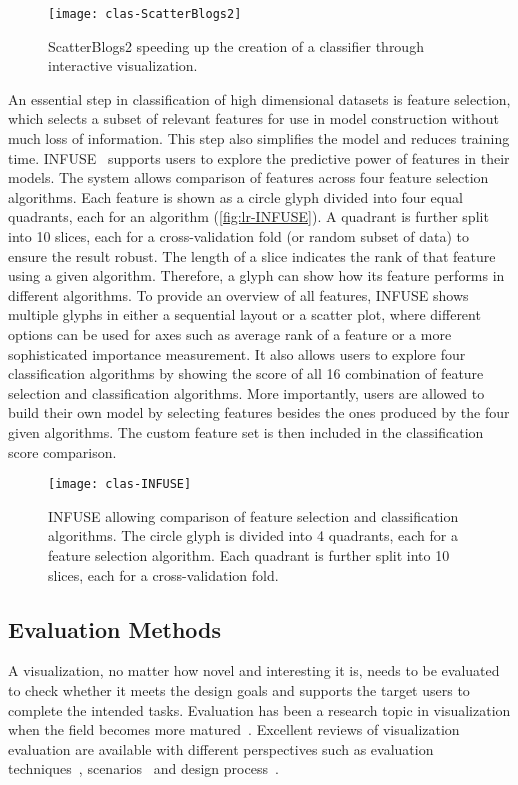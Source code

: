 \begin{figure}[!htb]
	\centering
	\texttt{[image: clas-ScatterBlogs2]}
	\caption[ScatterBlogs2 -- interactive classifier]{ScatterBlogs2 speeding up the creation of a classifier through interactive visualization. }
	\label{fig:lr-ScatterBlogs2}
\end{figure}

An essential step in classification of high dimensional datasets is feature selection, which selects a subset of relevant features for use in model construction without much loss of information. This step also simplifies the model and reduces training time. INFUSE~\cite{Krause2014} supports users to explore the predictive power of features in their models. The system allows comparison of features across four feature selection algorithms. Each feature is shown as a circle glyph divided into four equal quadrants, each for an algorithm (\autoref{fig:lr-INFUSE}). A quadrant is further split into 10 slices, each for a cross-validation fold (or random subset of data) to ensure the result  robust. The length of a slice indicates the rank of that feature using a given algorithm. Therefore, a glyph can show how its feature performs in different algorithms. To provide an overview of all features, INFUSE shows multiple glyphs in either a sequential layout or a scatter plot, where different options can be used for axes such as average rank of a feature or a more sophisticated importance measurement. It also allows users to explore four classification algorithms by showing the score of all 16 combination of feature selection and classification algorithms. More importantly, users are allowed to build their own model by selecting features besides the ones produced by the four given algorithms. The custom feature set is then included in the classification score comparison.

\begin{figure}[!htb]
	\centering
	\texttt{[image: clas-INFUSE]}
	\caption[INFUSE -- comparison of features in classification]{INFUSE allowing comparison of feature selection and classification algorithms. The circle glyph is divided into 4 quadrants, each for a feature selection algorithm. Each quadrant is further split into 10 slices, each for a cross-validation fold. }
	\label{fig:lr-INFUSE}
\end{figure}

\subsection{Evaluation Methods}
\label{sub:lr-evaluation}
A visualization, no matter how novel and interesting it is, needs to be evaluated to check whether it meets the design goals and supports the target users to complete the intended tasks. Evaluation has been a research topic in visualization when the field becomes more matured~\cite{Plaisant2004}. Excellent reviews of visualization evaluation are available with different perspectives such as evaluation techniques~\cite{Carpendale2008}, scenarios~\cite{Lam2012} and design process~\cite{Munroe2009}.


